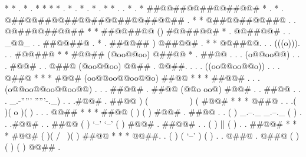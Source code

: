 *
                                                   *     .    *    .     *
                                                    *                   *
                                         *     .    *    .    *    .    *    .     *
                                          *     .                           .     *
                                      .     *         ##@@##@@##@@##@@#         *     .
                                *       .        @##@@##@@##@@##@@##@@##@@##        .       *
                                  *          @##@@##@@##@   .     . @@##@@##@@##          *
                                    *     ##@@##@@           ()            #@@##@@#     *
                               .        @@##@@# .     .     _@@_  .     .     ##@@##@        .
                         *       .    ##@@##                  )                  @##@@#    .       *
                            *       @@##@@.     .     .    (((o))).     .     .    #@@##@       *
                              *    #@@##                  (@oo@@oo)                  @##@@    *
                         .        ##@@    .     .     .   (o@@oo@@)     .     .     .  #@@#        .
                            .    @##@                     (@oo@@oo)                     @@##    .
                                @@##.     .     .     . ((oo@@oo@@o))   .     .     .    @##@
                     *  * *    #@@#                    (oo@@oo@@oo@@o)                    ##@@    * *  *
                              ##@@# .     .     .     (o@@oo@@oo@@oo@@) .     .     .     ##@@#
                       .      ##@@                   (@@o           oo@)                   #@@#      .
                         .    ##@@  .     .     .   _.-'''''    '''''-._)     .     .     .#@@#    .
                              ##@@                ) ( ~~~~        ~~~~  ) (                #@@#
                    * *  *   @##@   .     .     .( )(        o          )( )  .     .     . @@##   *  * *
                              ##@@               ( )                     ( )               #@@#
                         .    ##@@  .     .     (   ) _.--._     _.--._ (   ) .     .     .#@@#    .
                       .      ##@@              (   )   `--'     `--'   (   )              #@@#      .
                              ##@@# .     .     (   )        ||         (   ) .     .     ##@@#
                     *  * *    #@@#             (   )(      /  \       )(   )             ##@@    * *  *
                                @@##.     .     (   ) (     `--'      ) (   ) .     .    @##@
                            .    @##@            ( )   (             )   ( )            @@##    .
